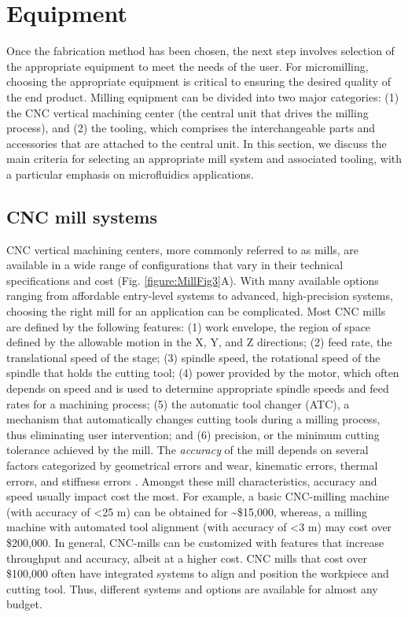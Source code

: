 \section{Equipment}
Once the fabrication method has been chosen, the next step involves selection of the appropriate equipment to meet the needs of the user. For micromilling, choosing the appropriate equipment is critical to ensuring the desired quality of the end product. Milling equipment can be divided into two major categories: (1) the CNC vertical machining center (the central unit that drives the milling process), and (2) the tooling, which comprises the interchangeable parts and accessories that are attached to the central unit. In this section, we discuss the main criteria for selecting an appropriate mill system and associated tooling, with a particular emphasis on microfluidics applications.

\subsection{CNC mill systems}
CNC vertical machining centers, more commonly referred to as mills, are available in a wide range of configurations that vary in their technical specifications and cost (Fig. \ref{figure:MillFig3}A). With many available options ranging from affordable entry-level systems to advanced, high-precision systems, choosing the right mill for an application can be complicated. Most CNC mills are defined by the following features: (1) work envelope, the region of space defined by the allowable motion in the X, Y, and Z directions; (2) feed rate, the translational speed of the stage; (3) spindle speed, the rotational speed of the spindle that holds the cutting tool; (4) power provided by the motor, which often depends on speed and is used to determine appropriate spindle speeds and feed rates for a machining process; (5) the automatic tool changer (ATC), a mechanism that automatically changes cutting tools during a milling process, thus eliminating user intervention; and (6) precision, or the minimum cutting tolerance achieved by the mill. The \textit{accuracy} of the mill depends on several factors categorized by geometrical errors and wear, kinematic errors, thermal errors, and stiffness errors \cite{Lamikiz2008}. Amongst these mill characteristics, accuracy and speed usually impact cost the most. For example, a basic CNC-milling machine (with accuracy of <25 \textmu m) can be obtained for \textasciitilde\$15,000, whereas, a milling machine with automated tool alignment (with accuracy of <3 \textmu m) may cost over \$200,000. In general, CNC-mills can be customized with features that increase throughput and accuracy, albeit at a higher cost. CNC mills that cost over \$100,000 often have integrated systems to align and position the workpiece and cutting tool.  Thus, different systems and options are available for almost any budget.

